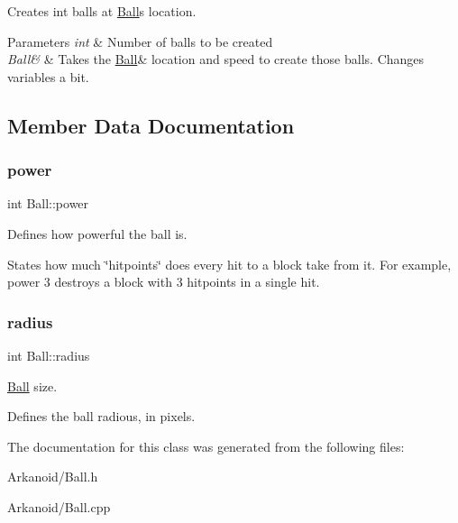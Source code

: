 Creates int balls at \hyperlink{class_ball}{Ball}\textquotesingle{}s location. 


\begin{DoxyParams}{Parameters}
{\em int} & Number of balls to be created\\
\hline
{\em Ball\&} & Takes the \hyperlink{class_ball}{Ball}\& location and speed to create those balls. Changes variables a bit. \\
\hline
\end{DoxyParams}


\subsection{Member Data Documentation}
\mbox{\label{class_ball_a5b6d417551e2b5cddbc68566891eea46}} 
\subsubsection{\texorpdfstring{power}{power}}
{\footnotesize\ttfamily int Ball\+::power}



Defines how powerful the ball is. 

States how much \char`\"{}hitpoints\char`\"{} does every hit to a block take from it. For example, power 3 destroys a block with 3 hitpoints in a single hit. \mbox{\label{class_ball_ab5b6ed9fe327aace1b4e4a6473838bc6}} 
\subsubsection{\texorpdfstring{radius}{radius}}
{\footnotesize\ttfamily int Ball\+::radius}



\hyperlink{class_ball}{Ball} size. 

Defines the ball radious, in pixels. 

The documentation for this class was generated from the following files\+:\begin{DoxyCompactItemize}
\item 
Arkanoid/Ball.\+h\item 
Arkanoid/Ball.\+cpp\end{DoxyCompactItemize}
